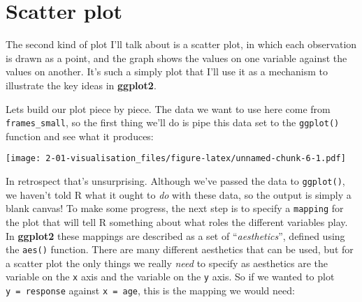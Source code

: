 \documentclass[]{book}
\newenvironment{Shaded}{\begin{snugshade}}{\end{snugshade}}
\newcommand{\DataTypeTok}[1]{\textcolor[rgb]{0.13,0.29,0.53}{#1}}
\newcommand{\KeywordTok}[1]{\textcolor[rgb]{0.13,0.29,0.53}{\textbf{#1}}}
\newcommand{\NormalTok}[1]{#1}
\newcommand{\OperatorTok}[1]{\textcolor[rgb]{0.81,0.36,0.00}{\textbf{#1}}}
\newcommand{\StringTok}[1]{\textcolor[rgb]{0.31,0.60,0.02}{#1}}
\begin{document}
\hypertarget{scatter-plot}{%
\section{Scatter plot}\label{scatter-plot}}

The second kind of plot I'll talk about is a scatter plot, in which each observation is drawn as a point, and the graph shows the values on one variable against the values on another. It's such a simply plot that I'll use it as a mechanism to illustrate the key ideas in \textbf{ggplot2}.

Lets build our plot piece by piece. The data we want to use here come from \texttt{frames\_small}, so the first thing we'll do is pipe this data set to the \texttt{ggplot()} function and see what it produces:

\begin{Shaded}
\end{Shaded}

\texttt{[image: 2-01-visualisation\_files/figure-latex/unnamed-chunk-6-1.pdf]}

In retrospect that's unsurprising. Although we've passed the data to \texttt{ggplot()}, we haven't told R what it ought to \emph{do} with these data, so the output is simply a blank canvas! To make some progress, the next step is to specify a \texttt{mapping} for the plot that will tell R something about what roles the different variables play. In \textbf{ggplot2} these mappings are described as a set of ``\emph{aesthetics}'', defined using the \texttt{aes()} function. There are many different aesthetics that can be used, but for a scatter plot the only things we really \emph{need} to specify as aesthetics are the variable on the \texttt{x} axis and the variable on the \texttt{y} axis. So if we wanted to plot \texttt{y\ =\ response} against \texttt{x\ =\ age}, this is the mapping we would need:

\begin{Shaded}
\end{Shaded}
\end{document}
